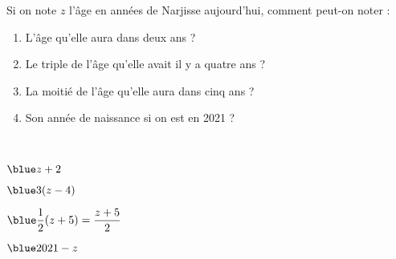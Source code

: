 \begin{colonne*exercice}
\bigskip

\begin{exercice} %
   Si on note $z$ l'âge en années de Narjisse aujourd'hui, comment peut-on noter :
   \begin{enumerate}
      \item L'âge qu'elle aura dans deux ans ?
      \item Le triple de l'âge qu'elle avait il y a quatre ans ?
      \item La moitié de l'âge qu'elle aura dans cinq ans ?
      \item Son année de naissance si on est en 2021 ?
   \end{enumerate}
\end{exercice}

\begin{corrige}
   \ \\ [-5mm]
   \begin{colenumerate}{2}
      \item $\blue z+2$
      \item $\blue 3(z-4)$
      \item $\blue \dfrac12(z+5) =\dfrac{z+5}{2}$ \smallskip
      \item $\blue 2021-z$
   \end{colenumerate}
\end{corrige}

\bigskip


\end{colonne*exercice}
